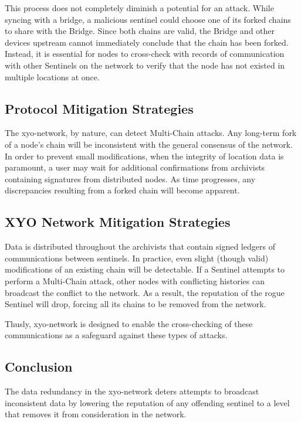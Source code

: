 \documentclass{article}
\begin{document}
This process does not completely diminish a potential for an attack. While syncing with a \Gls{bridge}, a malicious \Gls{sentinel} could choose one of its forked chains to share with the Bridge. Since both chains are valid, the Bridge and other  devices upstream cannot immediately conclude that the chain has been forked. Instead, it is essential for nodes to cross-check with records of communication with other Sentinels on the network to verify that the node has not existed in multiple locations at once. 

\subsection{Protocol Mitigation Strategies}

The \Gls{xyo-network}, by nature, can detect Multi-Chain attacks. Any long-term fork of a node's chain will be inconsistent with the general consensus of the network. In order to prevent small modifications, when the integrity of location data is paramount, a user may wait for additional confirmations from \Glspl{archivist} containing signatures from distributed nodes. As time progresses, any discrepancies resulting from a forked chain will become apparent.

\subsection{XYO Network Mitigation Strategies}

Data is distributed throughout the \Glspl{archivist} that contain signed ledgers of communications between \Glspl{sentinel}. In practice, even slight (though valid) modifications of an existing chain will be detectable. If a Sentinel attempts to perform a Multi-Chain attack, other nodes with conflicting histories can broadcast the conflict to the network. As a result, the reputation of the rogue Sentinel will drop, forcing all its chains to be removed from the network.

Thusly, \Gls{xyo-network} is designed to enable the cross-checking of these communications as a safeguard against these types of attacks.

\subsection{Conclusion}

The data redundancy in the \Gls{xyo-network} deters attempts to broadcast inconsistent data by lowering the reputation of any offending \Gls{sentinel} to a level that removes it from consideration in the network.
\end{document}
